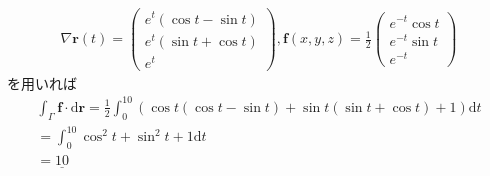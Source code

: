 \documentclass[dvipdfmx]{jsarticle}
\begin{document}
    \subsection{}
      \begin{align*}
        \nabla \bm{r}(t) =
        \begin{pmatrix}
          e^t(\cos t - \sin t)\\
          e^t(\sin t + \cos t)\\
          e^t
        \end{pmatrix}
        , \bm{f}(x, y, z) = \frac{1}{2}
        \begin{pmatrix}
          e^{-t} \cos t\\
          e^{-t} \sin t\\
          e^{-t}
        \end{pmatrix}
      \end{align*}
      を用いれば
      \begin{align*}
        \int_{\Gamma} \bm{f} \cdot \mathrm{d} \bm{r} =\frac{1}{2} \int_{0}^{10} (\cos t (\cos t - \sin t) + \sin t (\sin t + \cos t) + 1) \mathrm{d}t\\
        = \int_{0}^{10} \cos^2 t + \sin^2 t + 1 \mathrm{d}t\\
        = \underline{10}
      \end{align*}
\end{document}
